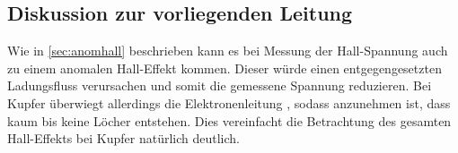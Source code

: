 \subsection{Diskussion zur vorliegenden Leitung}


%
%

Wie in \ref{sec:anomhall} beschrieben kann es bei Messung der Hall-Spannung auch zu einem anomalen Hall-Effekt kommen.
Dieser würde einen entgegengesetzten Ladungsfluss verursachen und somit die gemessene Spannung reduzieren.
Bei Kupfer überwiegt allerdings die Elektronenleitung \cite[8]{V311.pdf}, sodass anzunehmen ist, dass kaum bis keine Löcher entstehen.
Dies vereinfacht die Betrachtung des gesamten Hall-Effekts bei Kupfer natürlich deutlich.
